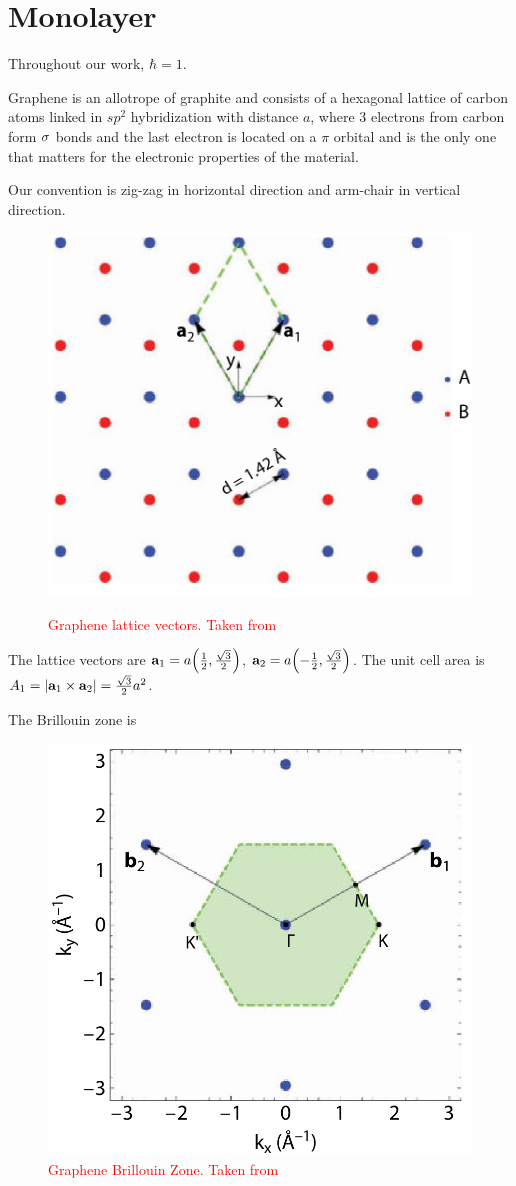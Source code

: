 \section{Monolayer}

Throughout our work, $\hbar = 1$.

\n

Graphene is an allotrope of graphite and consists of a hexagonal lattice of carbon atoms linked in $sp^2$ hybridization with distance $a$, where $3$ electrons from carbon form $\sigma$ bonds and the last electron is located on a $\pi$ orbital and is the only one that matters for the electronic properties of the material.

\n

Our convention is zig-zag in horizontal direction and arm-chair in vertical direction.

\begin{figure}[H]
\centering
\includegraphics[width=0.4\linewidth]{fig/graphene-lattice_vectors2.png}
\label{fig:graphene-lattice_vectors}
\caption{\textcolor{red}{Graphene lattice vectors. Taken from \cite{handbook2019}}}
\end{figure}

The lattice vectors are $\vb{a}_1 = a \qty(\frac{1}{2}, \frac{\sqrt{3}}{2})$, $\vb{a}_2 = a \qty(-\frac{1}{2}, \frac{\sqrt{3}}{2})$. The unit cell area is $ A_1 = \abs{{\vb{a}}_1 \times {\vb{a}}_2} = \frac{\sqrt{3}}{2} a^2 $.

The Brillouin zone is
\begin{figure}[H]
\centering
\includegraphics[width=0.3\linewidth]{fig/brillouin-zone-monolayer.png}
\caption{\textcolor{red}{Graphene Brillouin Zone. Taken from \cite{handbook2019}}}
\label{fig:brillouin-zone-monolayer}
\end{figure}

